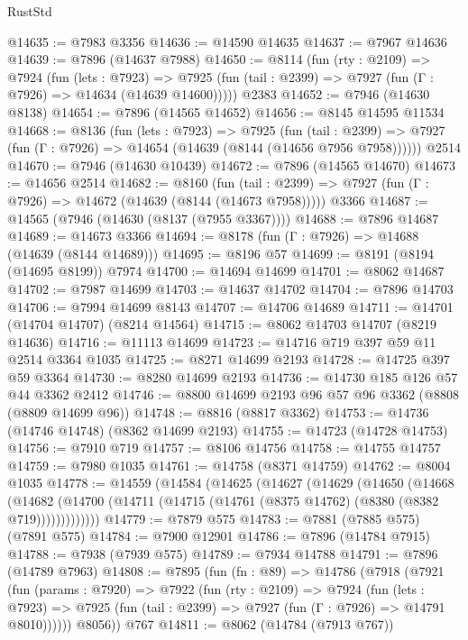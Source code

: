 \begin{lexlean}{RustStd}
\begin{coremodule}
@14635 := @7983 @3356
@14636 := @14590 @14635
@14637 := @7967 @14636
@14639 := @7896 (@14637 @7988)
@14650 := @8114
    (fun (rty : @2109) =>
    @7924
      (fun (lets : @7923) =>
      @7925 (fun (tail : @2399) => @7927 (fun (Γ : @7926) => @14634 (@14639 @14600)))))
    @2383
@14652 := @7946 (@14630 @8138)
@14654 := @7896 (@14565 @14652)
@14656 := @8145 @14595 @11534
@14668 := @8136
    (fun (lets : @7923) =>
    @7925
      (fun (tail : @2399) =>
      @7927 (fun (Γ : @7926) => @14654 (@14639 (@8144 (@14656 @7956 @7958))))))
    @2514
@14670 := @7946 (@14630 @10439)
@14672 := @7896 (@14565 @14670)
@14673 := @14656 @2514
@14682 := @8160
    (fun (tail : @2399) => @7927 (fun (Γ : @7926) => @14672 (@14639 (@8144 (@14673 @7958)))))
    @3366
@14687 := @14565 (@7946 (@14630 (@8137 (@7955 @3367))))
@14688 := @7896 @14687
@14689 := @14673 @3366
@14694 := @8178 (fun (Γ : @7926) => @14688 (@14639 (@8144 @14689)))
@14695 := @8196 @57
@14699 := @8191 (@8194 (@14695 @8199)) @7974
@14700 := @14694 @14699
@14701 := @8062 @14687
@14702 := @7987 @14699
@14703 := @14637 @14702
@14704 := @7896 @14703
@14706 := @7994 @14699 @8143
@14707 := @14706 @14689
@14711 := @14701 (@14704 @14707) (@8214 @14564)
@14715 := @8062 @14703 @14707 (@8219 @14636)
@14716 := @11113 @14699
@14723 := @14716 @719 @397 @59 @11 @2514 @3364 @1035
@14725 := @8271 @14699 @2193
@14728 := @14725 @397 @59 @3364
@14730 := @8280 @14699 @2193
@14736 := @14730 @185 @126 @57 @44 @3362 @2412
@14746 := @8800 @14699 @2193 @96 @57 @96 @3362 (@8808 (@8809 @14699 @96))
@14748 := @8816 (@8817 @3362)
@14753 := @14736 (@14746 @14748) (@8362 @14699 @2193)
@14755 := @14723 (@14728 @14753)
@14756 := @7910 @719
@14757 := @8106 @14756
@14758 := @14755 @14757
@14759 := @7980 @1035
@14761 := @14758 (@8371 @14759)
@14762 := @8004 @1035
@14778 := @14559
    (@14584
      (@14625
        (@14627
          (@14629
            (@14650
              (@14668
                (@14682
                  (@14700 (@14711 (@14715 (@14761 (@8375 @14762) (@8380 (@8382 @719)))))))))))))
@14779 := @7879 @575
@14783 := @7881 (@7885 @575) (@7891 @575)
@14784 := @7900 @12901
@14786 := @7896 (@14784 @7915)
@14788 := @7938 (@7939 @575)
@14789 := @7934 @14788
@14791 := @7896 (@14789 @7963)
@14808 := @7895
    (fun (fn : @89) =>
    @14786
      (@7918
        (@7921
          (fun (params : @7920) =>
          @7922
            (fun (rty : @2109) =>
            @7924
              (fun (lets : @7923) =>
              @7925 (fun (tail : @2399) => @7927 (fun (Γ : @7926) => @14791 @8010))))))
        @8056))
    @767
@14811 := @8062 (@14784 (@7913 @767))

\end{coremodule}
\end{lexlean}
